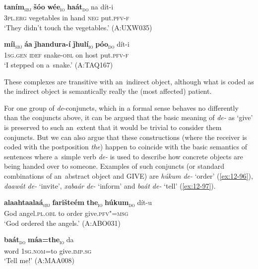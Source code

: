 \begin{exe}
\ex
\label{ex:12-94}
\gll {\ob}\textbf{taním}{\cb}\textsubscript{\textsc{\upshape sbj}} {\ob}\textbf{šóo} \textbf{wée}{\cb}\textsubscript{\textsc{\upshape io}} {\ob}\textbf{haát}{\cb}\textsubscript{\textsc{\upshape do}} na dít-i\\
\textsc{3pl.erg} vegetables in hand \textsc{neg} put.\textsc{pfv-f} \\
\glt `They didn't touch the vegetables.' (A:UXW035)
\end{exe}
\begin{exe}
\ex
\label{ex:12-95}
\gll {\ob}\textbf{míi}{\cb}\textsubscript{\textsc{\upshape sbj}} {\ob}\textbf{áa} \textbf{ǰhandura-í} \textbf{ǰhulí}{\cb}\textsubscript{\textsc{\upshape io}} {\ob}\textbf{póo}{\cb}\textsubscript{\textsc{\upshape do}} dít-i\\
\textsc{1sg.gen} \textsc{idef} snake-\textsc{obl} on host put.\textsc{pfv-f}\\
\glt `I stepped on a~snake.' (A:TAQ167)
\end{exe}

These complexes are transitive with an~indirect object, although what is coded as the indirect object is semantically really the (most affected) patient. 


 For one group of \textit{de}-conjuncts, which in a formal sense behaves no differently than the conjuncts above, it can be argued that the basic meaning of \textit{de-} as `give' is preserved to such an~extent that it would be trivial to consider them conjuncts. But we can also argue that these constructions (where the receiver is coded with the postposition \textit{the}) happen to coincide with the basic semantics of sentences where a~simple verb \textit{de-} is used to describe how concrete objects are being handed over to someone. Examples of such conjuncts (or standard combinations of an~abstract object and GIVE) are \textit{húkum de-} `order' (\ref{ex:12-96}), \textit{daawát de-} `invite', \textit{xabaár de-} `inform' and \textit{baát de-} `tell' (\ref{ex:12-97}).

\begin{exe}
\ex
\label{ex:12-96}
\gll {\ob}\textbf{alaahtaalaá}{\cb}\textsubscript{\textsc{\upshape sbj}} {\ob}\textbf{farišteém} \textbf{the}{\cb}\textsubscript{\textsc{\upshape io}} {\ob}\textbf{húkum}{\cb}\textsubscript{\textsc{\upshape do}} dít-u\\
God angel.\textsc{pl.obl} to order give.\textsc{pfv"=msg}\\
\glt `God ordered the angels.' (A:ABO031)
\end{exe}
\begin{exe}
\ex
\label{ex:12-97}
\gll {\ob}\textbf{baát}{\cb}\textsubscript{\textsc{\upshape do}} {\ob}\textbf{máa=the}{\cb}\textsubscript{\textsc{\upshape io}} da\\
word \textsc{1sg.nom=}to give.\textsc{imp.sg}\\
\glt `Tell me!' (A:MAA008)
\end{exe}

